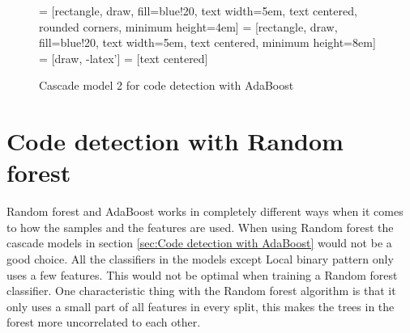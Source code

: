 \begin{figure}[H]
\centering
{} = [rectangle, draw, fill=blue!20, 
    text width=5em, text centered, rounded corners, minimum height=4em]
 = [rectangle, draw, fill=blue!20, 
    text width=5em, text centered, minimum height=8em]
 = [draw, -latex']
 = [text centered]

\caption{Cascade model 2 for code detection with AdaBoost}
\label{Cascade2}
\end{figure}


\section{Code detection with Random forest}
\label{sec:Code detection with Random forest}
Random forest and AdaBoost works in completely different ways when it comes to how the samples and the features are used. When using Random forest the cascade models in section \ref{sec:Code detection with AdaBoost} would not be a good choice. All the classifiers in the models except Local binary pattern only uses a few features. This would not be optimal when training a Random forest classifier. One characteristic thing with the Random forest algorithm is that it only uses a small part of all features in every split, this makes the trees in the forest more uncorrelated to each other.

